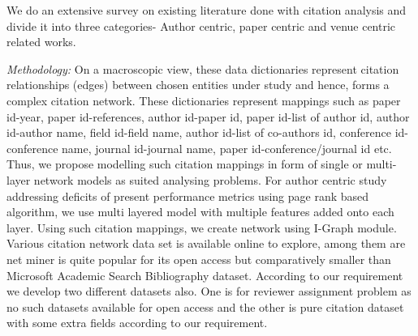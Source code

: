We do an extensive survey on existing literature done with citation analysis and divide it into three categories- Author centric, paper centric and venue centric related works.

{\em Methodology:}
On a macroscopic view, these data dictionaries represent citation relationships (edges) between chosen entities under study and hence, forms a complex citation network. These dictionaries represent mappings such as paper id-year, paper id-references, author id-paper id, paper id-list of author id, author id-author name, field id-field name, author id-list of co-authors id, conference id-conference name, journal id-journal name, paper id-conference/journal id etc. Thus, we propose modelling such citation mappings in form of single or multi-layer network models as suited analysing problems. For author centric study addressing deficits of present performance metrics using page rank based algorithm, we use multi layered model with multiple features added onto each layer. Using such citation mappings, we create network using I-Graph module. Various citation network data set is available online to explore, among them are net miner is quite popular for its open access but comparatively smaller than Microsoft Academic Search Bibliography dataset. According to our requirement we develop two different datasets also. One is for reviewer assignment problem as no such datasets available for open access and the other is pure citation dataset with some extra fields according to our requirement.